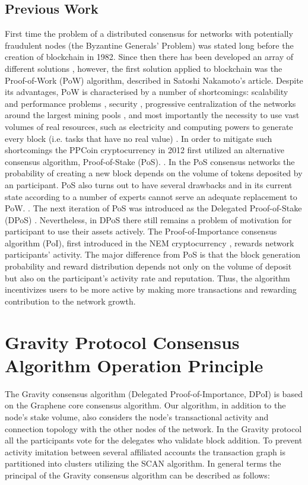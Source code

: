 \documentclass[a4paper,12pt]{article}
\begin{document}
\subsection{Previous Work}
First time the problem of a distributed consensus for networks with potentially fraudulent
nodes (the Byzantine Generals’ Problem) was stated long before the creation of blockchain
in 1982. \cite{Lamport} Since then there has been developed an array of different solutions \cite{Castro},
however, the first solution applied to blockchain was the Proof-of-Work (PoW) algorithm,
described in Satoshi Nakamoto’s article. \cite{satoshi} Despite its advantages, PoW is characterised by
a number of shortcomings: scalability and performance problems \cite{Croman}, security \cite{Eyal},
progressive centralization of the networks around the largest mining pools \cite{Buterin}, and most
importantly the necessity to use vast volumes of real resources, such as electricity and
computing powers to generate every block (i.e. tasks that have no real value) \cite{Bentov}.
In order to mitigate such shortcomings the PPCoin cryptocurrency in 2012 first utilized an
alternative consensus algorithm, Proof-of-Stake (PoS). \cite{Ppcoin}. In the PoS consensus networks
the probability of creating a new block depends on the volume of tokens deposited by an
participant. PoS also turns out to have several drawbacks and in its current state according
to a number of experts cannot serve an adequate replacement to PoW. \cite{Demeester}. The next
iteration of PoS was introduced as the Delegated Proof-of-Stake (DPoS) \cite{dantheman}. Nevertheless,
in DPoS there still remains a problem of motivation for participant to use their assets actively.
The Proof-of-Importance consensus algorithm (PoI), first introduced in the NEM
cryptocurrency \cite{nem}, rewards network participants’ activity. The major difference from PoS is that
the block generation probability and reward distribution depends not only on the volume of
deposit but also on the participant’s activity rate and reputation. Thus, the algorithm
incentivizes users to be more active by making more transactions and rewarding contribution
to the network growth.

\section{Gravity Protocol Consensus Algorithm Operation Principle}
The Gravity consensus algorithm (Delegated Proof-of-Importance, DPoI) is based on the
Graphene core consensus algorithm. Our algorithm, in addition to the node’s stake volume,
also considers the node’s transactional activity and connection topology with the other nodes
of the network. In the Gravity protocol all the participants vote for the delegates who validate block addition. To prevent activity imitation between several affiliated accounts the
transaction graph is partitioned into clusters utilizing the SCAN algorithm. In general terms
the principal of the Gravity consensus algorithm can be described as follows:
\end{document}
